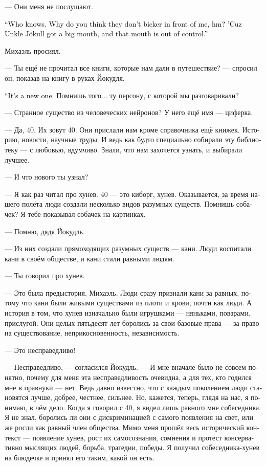 \documentclass[a4paper,12pt,fleqn]{book}\usepackage{cooltooltips}\usepackage{polyglossia}\setdefaultlanguage[babelshorthands=true]{russian}\setotherlanguage{english}\defaultfontfeatures{Ligatures=TeX,Mapping=tex-text} \usepackage{xcolor}\definecolor{lightgray}{HTML}{bbbbbb}\color{lightgray}\newcommand{\ml}[3]{\textenglish{\textcolor{black}{#3}}}
\begin{document}
--- Они меня не послушают.

\ml{$0$}
{--- Кто знает.}
{``Who knows.}
\ml{$0$}
{Как ты думаешь, почему они не цапаются при мне, м?}
{Why do you think they don't bicker in front of me, hm?}
\ml{$0$}
{Потому что у дяди Йокудля язык без костей и отсутствуют тормоза.}
{'Cuz Unkle Jökull got a big mouth, and that mouth is out of control.''}

Михаэль просиял.

--- Ты ещё не прочитал все книги, которые нам дали в путешествие? --- спросил он, показав на книгу в руках Йокудля.

\ml{$0$}
{--- Это новая.}
{``It's a new one.}
Помнишь того... ту персону, с которой мы разговаривали?

--- Странное существо из человеческих нейронов?
У него ещё имя --- циферка.

--- Да, 40.
Их зовут 40.
Они прислали нам кроме справочника ещё книжек.
Историю, новости, научные труды.
И ведь как будто специально собирали эту библиотеку --- с любовью, вдумчиво.
Знали, что нам захочется узнать, и выбирали лучшее.

--- И что нового ты узнал?

--- Я как раз читал про хунев.
40 --- это киборг, хунев.
Оказывается, за время нашего полёта люди создали несколько видов разумных существ.
Помнишь собачек?
Я тебе показывал собачек на картинках.

--- Помню, дядя Йокудль.

--- Из них создали прямоходящих разумных существ --- кани.
Люди воспитали кани в своём обществе, и кани стали равными людям.

--- Ты говорил про хунев.

--- Это была предыстория, Михаэль.
Люди сразу признали кани за равных, потому что кани были живыми существами из плоти и крови, почти как люди.
А история в том, что хунев изначально были игрушками --- няньками, поварами, прислугой.
Они целых пятьдесят лет боролись за свои базовые права --- за право на существование, неприкосновенность, независимость.

--- Это несправедливо!

--- Несправедливо, --- согласился Йокудль.
--- И мне вначале было не совсем понятно, почему для меня эта несправедливость очевидна, а для тех, кто годился мне в правнуки --- нет.
Ведь давно известно, что с каждым поколением люди становятся лучше, добрее, честнее, сильнее.
Но, кажется, теперь, глядя на нас, я понимаю, в чём дело.
Когда я говорил с 40, я видел лишь равного мне собеседника.
Я не знал, боролись ли они с дискриминацией с самого появления на свет, или же росли как равный член общества.
Мимо меня прошёл весь исторический контекст --- появление хунев, рост их самосознания, сомнения и протест консервативно мыслящих людей, борьба, трагедии, победы.
Я получил собеседника-хунев на блюдечке и принял его таким, какой он есть.
\end{document}
